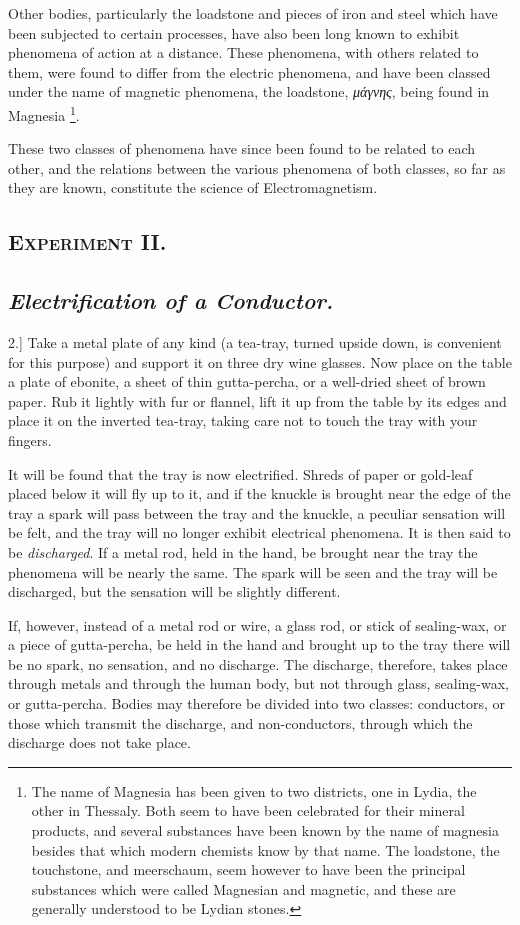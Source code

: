 \documentclass[12pt,oneside]{book}[2021/10/04]
\let\oldfootnote\footnote
\renewcommand\footnote[1]{%
\oldfootnote{\hspace{0.14em}#1}}
\newcommand{\Heading}{\centering\normalfont}
\newcommand{\Section}[1]{\subsection*{\normalsize\Heading\scshape #1}}
\newcommand{\Subsection}[1]{\subsection*{\normalsize\Heading\itshape #1}}
\newcommand{\article}[1]{\phantomsection \label{art:#1}{#1.]}}
\newcommand{\¬}{\hphantom{0}}
\begin{document}
Other bodies, particularly the loadstone and pieces of iron and
steel which have been subjected to certain processes, have also been
long known to exhibit phenomena of action at a distance. These
phenomena, with others related to them, were found to differ from
the electric phenomena, and have been classed under the name of
magnetic phenomena, the loadstone, {\greekfont \textit{μάγνης}}, being found in
Magnesia\footnote{
The name of Magnesia has been given to two districts, one in Lydia, the other in
Thessaly. Both seem to have been celebrated for their mineral products, and several
substances have been known by the name of magnesia besides that which modern
chemists know by that name. The loadstone, the touchstone, and meerschaum,
seem however to have been the principal substances which were called Magnesian
and magnetic, and these are generally understood to be Lydian stones.
}.

These two classes of phenomena have since been found to be
related to each other, and the relations between the various phenomena
of both classes, so far as they are known, constitute the
science of Electromagnetism.

\Section{Experiment II.}
\Subsection{Electrification of a Conductor.}

\article{2}
Take a metal plate of any kind (a tea-tray, turned upside
down, is convenient for this purpose) and support it on three dry
wine glasses. Now place on the table a plate of ebonite, a sheet
of thin gutta-percha, or a well-dried sheet of brown paper. Rub it
lightly with fur or flannel, lift it up from the table by its edges
and place it on the inverted tea-tray, taking care not to touch the
tray with your fingers.

It will be found that the tray is now electrified. Shreds of
paper or gold-leaf placed below it will fly up to it, and if the
knuckle is brought near the edge of the tray a spark will pass
between the tray and the knuckle, a peculiar sensation will be felt,
and the tray will no longer exhibit electrical phenomena. It is
then said to be \textit{discharged}. If a metal rod, held in the hand, be
brought near the tray the phenomena will be nearly the same.
The spark will be seen and the tray will be discharged, but the
sensation will be slightly different.

If, however, instead of a metal rod or wire, a glass rod, or stick
of sealing-wax, or a piece of gutta-percha, be held in the hand and
brought up to the tray there will be no spark, no sensation, and
no discharge. The discharge, therefore, takes place through metals
and through the human body, but not through glass, sealing-wax,
or gutta-percha. Bodies may therefore be divided into two
classes: conductors, or those which transmit the discharge, and
non-conductors, through which the discharge does not take place.
\end{document}
